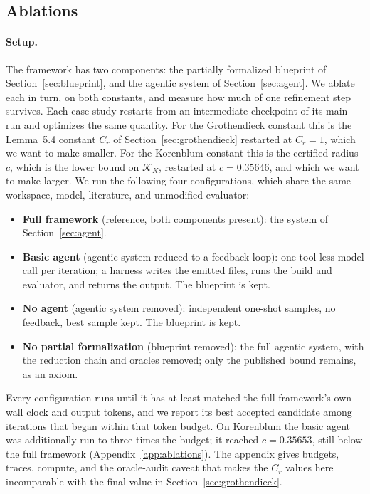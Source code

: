 \subsection{Ablations}
\label{sec:ablations}

\paragraph{Setup.}
The framework has two components: the partially formalized blueprint of
Section~\ref{sec:blueprint}, and the agentic system of
Section~\ref{sec:agent}. We ablate each in turn, on both constants, and
measure how much of one refinement step survives. Each case study restarts
from an intermediate checkpoint of its main run and optimizes the same
quantity. For the Grothendieck constant this is the Lemma~5.4 constant $C_r$ of
Section~\ref{sec:grothendieck} restarted at $C_r = 1$, which we want to make
smaller. For the Korenblum constant this is the certified radius $c$, which is
the lower bound on $\mathcal{K}_K$, restarted at $c = 0.35646$, and which we
want to make larger. We run the following four configurations, which share the
same workspace, model, literature, and unmodified evaluator:
\begin{itemize}
\setlength{\itemsep}{0pt}\setlength{\topsep}{2pt}
\item \textbf{Full framework} (reference, both components present): the system
  of Section~\ref{sec:agent}.
\item \textbf{Basic agent} (agentic system reduced to a feedback loop): one
  tool-less model call per iteration; a harness writes the emitted files, runs
  the build and evaluator, and returns the output. The blueprint is kept.
\item \textbf{No agent} (agentic system removed): independent one-shot
  samples, no feedback, best sample kept. The blueprint is kept.
\item \textbf{No partial formalization} (blueprint removed): the full agentic
  system, with the reduction chain and oracles removed; only the published
  bound remains, as an axiom.
\end{itemize}
Every configuration runs until it has at least matched the full framework's
own wall clock and output tokens, and we report its best accepted candidate
among iterations that began within that token budget. On Korenblum the basic
agent was additionally run to three times the budget; it reached $c = 0.35653$,
still below the full framework (Appendix~\ref{app:ablations}). The appendix
gives budgets, traces, compute, and the oracle-audit caveat that makes the
$C_r$ values here incomparable with the final value in
Section~\ref{sec:grothendieck}.

